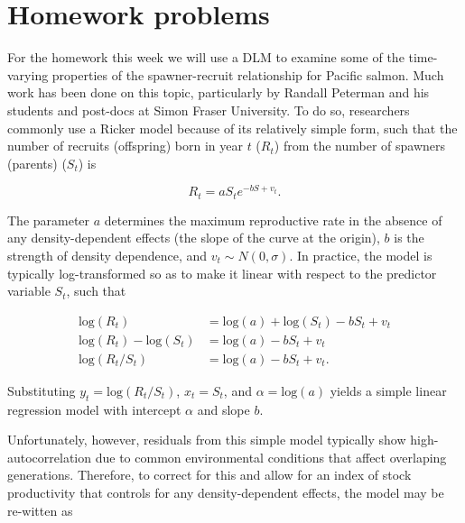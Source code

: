 \documentclass[10pt]{article}
\begin{document}
\newpage

\section{Homework problems}

For the homework this week we will use a DLM to examine some of the time-varying properties of the spawner-recruit relationship for Pacific salmon.  Much work has been done on this topic, particularly by Randall Peterman and his students and post-docs at Simon Fraser University.  To do so, researchers commonly use a Ricker model because of its relatively simple form, such that the number of recruits (offspring) born in year $t$ ($R_t$) from the number of spawners (parents) ($S_t$) is

\begin{equation}\label{eqn:baseRicker}
R_t = a S_t e^{-b S + v_t}.
\end{equation}


\noindent The parameter $a$ determines the maximum reproductive rate in the absence of any density-dependent effects (the slope of the curve at the origin), $b$ is the strength of density dependence, and $v_t \sim N(0,\sigma)$.  In practice, the model is typically log-transformed so as to make it linear with respect to the predictor variable $S_t$, such that

\begin{equation}\label{eqn:lnRicker}
\begin{aligned}
\text{log}(R_t) &= \text{log}(a) + \text{log}(S_t) -b S_t + v_t \\
\text{log}(R_t) - \text{log}(S_t) &= \text{log}(a) -b S_t + v_t \\
\text{log}(R_t/S_t) &= \text{log}(a) - b S_t + v_t.
\end{aligned}
\end{equation}


\noindent Substituting $y_t = \text{log}(R_t/S_t)$, $x_t = S_t$, and $\alpha = \text{log}(a)$ yields a simple linear regression model with intercept $\alpha$ and slope $b$.

Unfortunately, however, residuals from this simple model typically show high-autocorrelation due to common environmental conditions that affect overlaping generations.  Therefore, to correct for this and allow for an index of stock productivity that controls for any density-dependent effects, the model may be re-witten as
\end{document}
